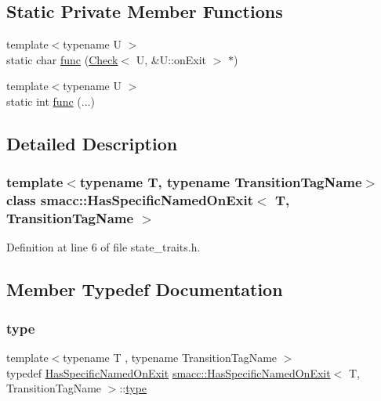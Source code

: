 \subsection*{Static Private Member Functions}
\begin{DoxyCompactItemize}
\item 
{\footnotesize template$<$typename U $>$ }\\static char \hyperlink{classsmacc_1_1HasSpecificNamedOnExit_aeaaa52aa3aeb9d4c912aa953e020ab50}{func} (\hyperlink{structsmacc_1_1HasSpecificNamedOnExit_1_1Check}{Check}$<$ U, \&U\+::on\+Exit $>$ $\ast$)
\item 
{\footnotesize template$<$typename U $>$ }\\static int \hyperlink{classsmacc_1_1HasSpecificNamedOnExit_a5df0edab149c42bfd6e5a7221150095a}{func} (...)
\end{DoxyCompactItemize}


\subsection{Detailed Description}
\subsubsection*{template$<$typename T, typename Transition\+Tag\+Name$>$\newline
class smacc\+::\+Has\+Specific\+Named\+On\+Exit$<$ T, Transition\+Tag\+Name $>$}



Definition at line 6 of file state\+\_\+traits.\+h.



\subsection{Member Typedef Documentation}
\mbox{\label{classsmacc_1_1HasSpecificNamedOnExit_a79c051b3a86d6a6c05d4c3420d7147ff}} 
\subsubsection{\texorpdfstring{type}{type}}
{\footnotesize\ttfamily template$<$typename T , typename Transition\+Tag\+Name $>$ \\
typedef \hyperlink{classsmacc_1_1HasSpecificNamedOnExit}{Has\+Specific\+Named\+On\+Exit} \hyperlink{classsmacc_1_1HasSpecificNamedOnExit}{smacc\+::\+Has\+Specific\+Named\+On\+Exit}$<$ T, Transition\+Tag\+Name $>$\+::\hyperlink{classsmacc_1_1HasSpecificNamedOnExit_a79c051b3a86d6a6c05d4c3420d7147ff}{type}}



